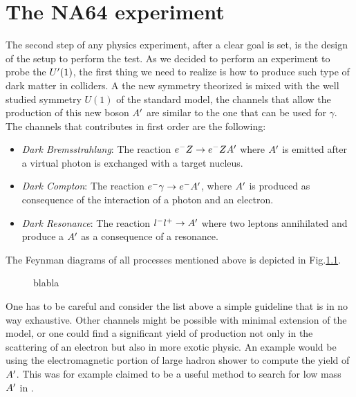 
\newcommand{\pdirtwo}{chapters/chapter2/plots}

\chapter{The NA64 experiment} %

\label{chapter2} %


The second step of any physics experiment, after a clear goal is set, is the design of the setup to perform the test. As we decided to perform an experiment to probe the $U'(1)$, the first thing we need to realize is how to produce such type of dark matter in colliders. A the new symmetry theorized is mixed with the well studied symmetry $U(1)$ of the standard model, the channels that allow the production of this new boson $A'$ are similar to the one that can be used for $\gamma$. The channels that contributes in first order are the following:

\begin{itemize}
\item \textit{Dark Bremsstrahlung}: The reaction $e^- Z \to e^- Z A'$ where $A'$ is emitted after a virtual photon is exchanged with a target nucleus.
\item \textit{Dark Compton}: The reaction $e^- \gamma \to e^- A'$, where $A'$ is produced as consequence of the interaction of a photon and an electron.
\item \textit{Dark Resonance}: The reaction $l^- l^+ \to A'$ where two leptons annihilated and produce a $A'$ as a consequence of a resonance.
\end{itemize}

The Feynman diagrams of all processes mentioned above is depicted in Fig.\ref{fig:dm-production-mechanism}.

\begin{figure}
  \centering

  \caption{blabla}
  \label{fig:dm-production-mechanism}
\end{figure}

One has to be careful and consider the list above a simple guideline that is in no way exhaustive. Other channels might be possible with minimal extension of the model, or one could find a significant yield of production not only in the scattering of an electron but also in more exotic physic. An example would be using the electromagnetic portion of large hadron shower to compute the yield of $A'$. This was for example claimed to be a useful method to search for low mass $A'$ in \cite{Celentano:2020vtu}.

